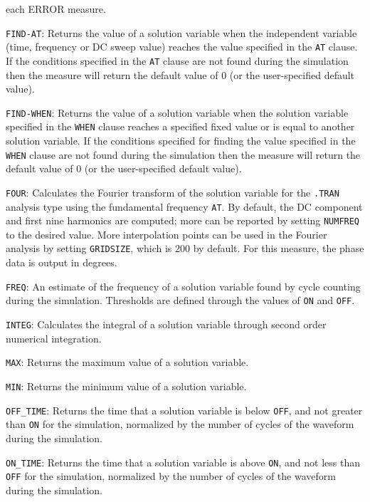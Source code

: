 {{\begin{XyceItemize}
    each ERROR measure.
 \item \texttt{FIND-AT}: Returns the value of a solution variable when the independent variable
    (time, frequency or DC sweep value) reaches the value specified in the \texttt{AT} clause.
    If the conditions specified in the \texttt{AT} clause are not found during the simulation
    then the measure will return the default value of 0 (or the user-specified default value).
 \item \texttt{FIND-WHEN}: Returns the value of a solution variable when the solution variable specified 
    in the \texttt{WHEN} clause reaches a specified fixed value or is equal to another solution variable.  
    If the conditions specified for finding the value specified in the \texttt{WHEN} clause are not found 
    during the simulation then the measure will return the default value of 0 (or the user-specified 
    default value).
  \item \texttt{FOUR}: Calculates the Fourier transform of the solution variable for the \texttt{.TRAN}
    analysis type using the fundamental frequency \texttt{AT}.  By default, the DC component 
    and first nine harmonics are computed; more can be reported by setting \texttt{NUMFREQ} to the
    desired value.  More interpolation points can be used in the Fourier analysis by setting \texttt{GRIDSIZE},
    which is $200$ by default.  For this measure, the phase data is output in degrees.
  \item \texttt{FREQ}: An estimate of the frequency of a solution variable found by cycle counting
    during the simulation.  Thresholds are defined through the values of \texttt{ON} 
    and \texttt{OFF}.
  \item \texttt{INTEG}: Calculates the integral of a solution variable through second order numerical 
    integration.
  \item \texttt{MAX}: Returns the maximum value of a solution variable.
  \item \texttt{MIN}: Returns the minimum value of a solution variable.
  \item \texttt{OFF\_TIME}: Returns the time that a solution variable is below \texttt{OFF}, and not
    greater than \texttt{ON} for the simulation, normalized by the number of cycles
of the waveform during the simulation.
  \item \texttt{ON\_TIME}: Returns the time that a solution variable is above \texttt{ON}, and not
    less than \texttt{OFF} for the simulation, normalized by the number of cycles
of the waveform during the simulation.

\end{XyceItemize}}}
